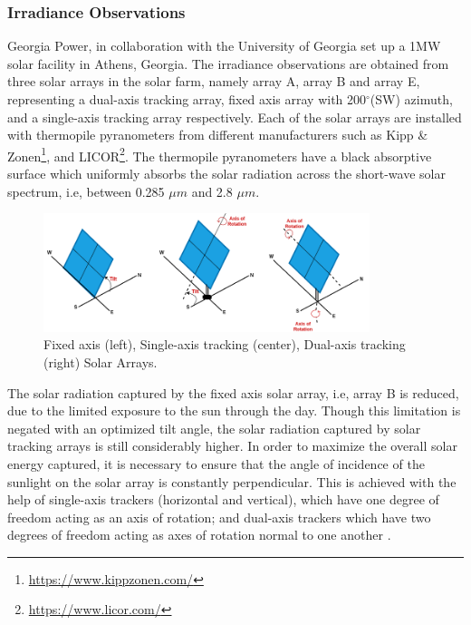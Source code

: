 \subsubsection*{Irradiance Observations}
\par Georgia Power, in collaboration with the University of Georgia set up a 1MW solar facility in Athens, Georgia. The irradiance observations are obtained from three solar arrays in the solar farm, namely array A, array B and array E, representing a dual-axis tracking array, fixed axis array with 200$^{\circ}$(SW) azimuth, and a single-axis tracking array respectively. Each of the solar arrays are installed with thermopile pyranometers from different manufacturers such as Kipp \& Zonen\footnote{\url{https://www.kippzonen.com/}}, and LICOR\footnote{\url{https://www.licor.com/}}. The thermopile pyranometers have a black absorptive surface which uniformly absorbs the solar radiation across the short-wave solar spectrum, i.e, between 0.285 $\mu m$ and 2.8 $\mu m$. 

\begin{figure}[htbp]
    \begin{center}
    	\includegraphics[width=0.85\textwidth]{chapter3/fig_pyranometers.png}
    	\caption[Fixed axis, Single-axis tracking, Dual-axis tracking Solar Arrays]{Fixed axis (left), Single-axis tracking (center), Dual-axis tracking (right) Solar Arrays.}
    	\label{fig:fig_pyranometers}
    \end{center}
\end{figure}

The solar radiation captured by the fixed axis solar array, i.e, array B is reduced, due to the limited exposure to the sun through the day. Though this limitation is negated with an optimized tilt angle, the solar radiation captured by solar tracking arrays is still considerably higher. In order to maximize the overall solar energy captured, it is necessary to ensure that the angle of incidence of the sunlight on the solar array is constantly perpendicular. This is achieved with the help of single-axis trackers (horizontal and vertical), which have one degree of freedom acting as an axis of rotation; and dual-axis trackers which have two degrees of freedom acting as axes of rotation normal to one another \cite{irradiance_solartracker}.  

